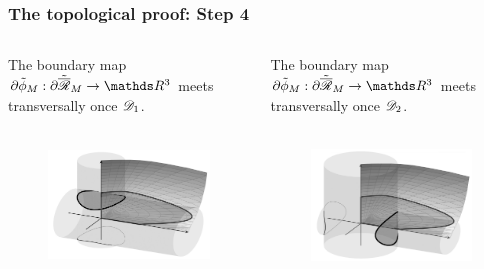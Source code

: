 \documentclass{beamer}
\begin{document}
\begin{frame}
\frametitle{The topological proof: \textbf{Step 4}}

\begin{columns}
\begin{column}{0.5\textwidth}
\begin{center}The boundary map $\partial\tilde{\phi}_M:\partial\tilde{\overline{\Rr}}_M\rightarrow\R^3$ meets transversally once $\mathscr{D}_1$.
\end{center}\begin{figure}[!ht]
\begin{center}
\includegraphics[height=4cm]{plots/ch3_02_B2.png}
\end{center}
\end{figure}
\end{column}
\begin{column}{0.5\textwidth}
\begin{center}The boundary map $\partial\tilde{\phi}_M:\partial\tilde{\overline{\Rr}}_M\rightarrow\R^3$ meets transversally once $\mathscr{D}_2$.
\end{center}\begin{figure}[!ht]
\begin{center}
\includegraphics[height=4cm]{plots/ch3_01_A2.png}
\end{center}
\end{figure}
\end{column}
\end{columns}

\end{frame}
\backupend
\end{document}
